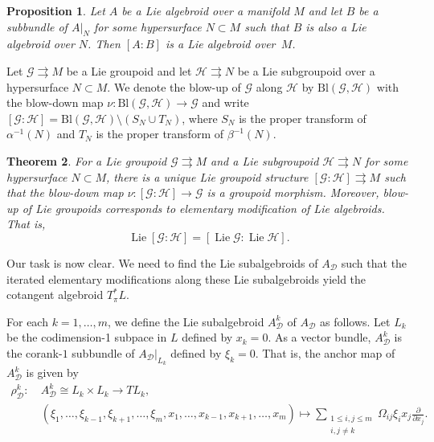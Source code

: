 \documentclass{amsart}
\newtheorem{theorem}{Theorem}[section]
\newtheorem{proposition}[theorem]{Proposition}
\numberwithin{equation}{section}
\newcommand{\cD}{\mathcal{D}}
\newcommand{\cG}{\mathcal{G}}
\newcommand{\cH}{\mathcal{H}}
\newcommand{\Lie}{\operatorname{Lie}}
\newcommand{\rra}{\rightrightarrows}
\begin{document}
\begin{proposition} 
  \cite{GL14}
  Let $A$ be a Lie algebroid over a manifold $M$ and let $B$ be a subbundle of $A|_N$ for some hypersurface $N\subset M$ such that $B$ is also a Lie algebroid over $N$.
  Then $[A\!:\!B]$ is a Lie algebroid over~$M$.
\end{proposition}

Let $\cG \rra M$ be a Lie groupoid and let $\cH \rra N$ be a Lie subgroupoid over a hypersurface $N\subset M$.
We denote the blow-up of $\cG$ along $\cH$ by $\mathrm{Bl}(\cG, \cH)$ with the blow-down map $\nu: \mathrm{Bl}(\cG, \cH) \to \cG$ and write $[\cG\!:\!\cH] = \mathrm{Bl}(\cG, \cH) \setminus (S_N \cup T_N)$, where $S_N$ is the proper transform of $\alpha^{-1}(N)$ and $T_N$ is the proper transform of $\beta^{-1}(N)$.

\begin{theorem} 
  \cite{GL14}
  For a Lie groupoid $\cG \rra M$ and a Lie subgroupoid $\cH \rra N$ for some hypersurface $N\subset M$, there is a unique Lie groupoid structure $[\cG\!:\!\cH] \rra M$ such that the blow-down map $\nu: [\cG\!:\!\cH] \to \cG$ is a groupoid morphism.
  Moreover, blow-up of Lie groupoids corresponds to elementary modification of Lie algebroids.
  That is,
  \[\Lie[\cG\!:\!\cH] = [\Lie\cG\!:\!\Lie\cH].\]
\end{theorem}

Our task is now clear.
We need to find the Lie subalgebroids of $A_\cD$ such that the iterated elementary modifications along these Lie subalgebroids yield the cotangent algebroid $T^*_\pi L$.

For each $k = 1, \ldots, m$, we define the Lie subalgebroid $A_\cD^k$ of $A_\cD$ as follows.
Let $L_k$ be the codimension-1 subpace in $L$ defined by $x_k = 0$.
As a vector bundle, $A_\cD^k$ is the corank-$1$ subbundle of $A_\cD |_{L_k}$ defined by $\xi_k = 0$.
That is, the anchor map of $A_\cD^k$ is given by
\begin{align*}
  \rho_\cD^k: ~& A_\cD^k \cong L_k\times L_k \to TL_k, \\
  & (\xi_1, \ldots, \xi_{k-1}, \xi_{k+1}, \ldots, \xi_m, x_1, \ldots, x_{k-1}, x_{k+1}, \ldots, x_m) \mapsto \sum_{\substack{1\le i,j \le m\\ i,j\ne k}} \Omega_{ij}\xi_i x_j\frac{\partial}{\partial x_j}.
\end{align*}
\end{document}
